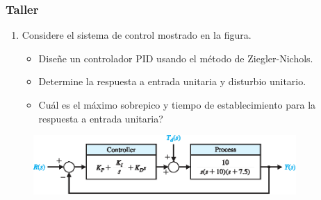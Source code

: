 \documentclass[aspectratio=169]{beamer}
\theoremstyle{definition}
\theoremstyle{plain}
\theoremstyle{remark}
\newcounter{saveenumi}
\newcommand{\seti}{\setcounter{saveenumi}{\value{enumi}}}
\begin{document}
\begin{frame}[c]\frametitle{Taller}
	\begin{enumerate}
		\item Considere el sistema de control mostrado en la figura.
		\begin{itemize}
			\item Diseñe un controlador PID usando el método de Ziegler-Nichols.
			\item Determine la respuesta a entrada unitaria y disturbio unitario.
			\item Cuál es el máximo sobrepico y tiempo de establecimiento para la respuesta a entrada unitaria?
		\end{itemize}
		\seti
	\end{enumerate}
	\begin{figure}
		\includegraphics[width=10cm]{images/ejercicio1.eps}
	\end{figure}
\end{frame}
\end{document}
